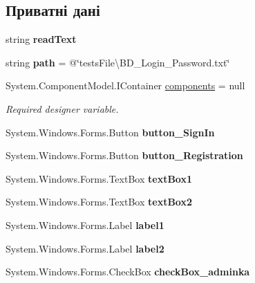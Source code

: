 \subsection*{Приватні дані}
\begin{DoxyCompactItemize}
\item 
string {\bfseries read\+Text}\hypertarget{class_tests_1_1_form1_a5184480c920c20fa37adce88de490bd6}{}\label{class_tests_1_1_form1_a5184480c920c20fa37adce88de490bd6}

\item 
string {\bfseries path} = @\char`\"{}tests\+File\textbackslash{}\+B\+D\+\_\+\+Login\+\_\+\+Password.\+txt\char`\"{}\hypertarget{class_tests_1_1_form1_a4ed428771494f356b00fc2066168d3f8}{}\label{class_tests_1_1_form1_a4ed428771494f356b00fc2066168d3f8}

\item 
System.\+Component\+Model.\+I\+Container \hyperlink{class_tests_1_1_form1_a98b604da06333c2647452a13c82d1266}{components} = null
\begin{DoxyCompactList}\small\item\em Required designer variable. \end{DoxyCompactList}\item 
System.\+Windows.\+Forms.\+Button {\bfseries button\+\_\+\+Sign\+In}\hypertarget{class_tests_1_1_form1_a8f99b3e333247f974869a05779c50c3b}{}\label{class_tests_1_1_form1_a8f99b3e333247f974869a05779c50c3b}

\item 
System.\+Windows.\+Forms.\+Button {\bfseries button\+\_\+\+Registration}\hypertarget{class_tests_1_1_form1_a0560759b788cb2777015e1d4fe1cf7cb}{}\label{class_tests_1_1_form1_a0560759b788cb2777015e1d4fe1cf7cb}

\item 
System.\+Windows.\+Forms.\+Text\+Box {\bfseries text\+Box1}\hypertarget{class_tests_1_1_form1_ac36a69acb7a9ed3387b08fd878c5f3ad}{}\label{class_tests_1_1_form1_ac36a69acb7a9ed3387b08fd878c5f3ad}

\item 
System.\+Windows.\+Forms.\+Text\+Box {\bfseries text\+Box2}\hypertarget{class_tests_1_1_form1_aa2d3b42202675e420de232a5bda1b156}{}\label{class_tests_1_1_form1_aa2d3b42202675e420de232a5bda1b156}

\item 
System.\+Windows.\+Forms.\+Label {\bfseries label1}\hypertarget{class_tests_1_1_form1_acfe16ee506f1ce1e06fbe474a9ddc5b6}{}\label{class_tests_1_1_form1_acfe16ee506f1ce1e06fbe474a9ddc5b6}

\item 
System.\+Windows.\+Forms.\+Label {\bfseries label2}\hypertarget{class_tests_1_1_form1_a83300d890a80130ed98355d16b01c06b}{}\label{class_tests_1_1_form1_a83300d890a80130ed98355d16b01c06b}

\item 
System.\+Windows.\+Forms.\+Check\+Box {\bfseries check\+Box\+\_\+adminka}\hypertarget{class_tests_1_1_form1_ad0eea4d9c6a082c8010281c105cc5a0e}{}\label{class_tests_1_1_form1_ad0eea4d9c6a082c8010281c105cc5a0e}

\end{DoxyCompactItemize}


